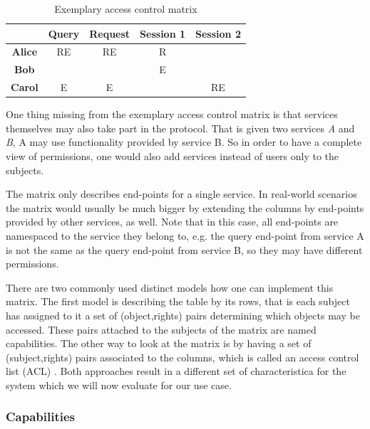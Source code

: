 \begin{table}
    \centering
    \begin{tabular}{|c|c|c|c|c|}
        \hline
              & \bfseries Query & \bfseries Request & \bfseries Session 1 & \bfseries Session 2\\
        \hline
        \bfseries Alice & RE    & RE      & R         &\\
        \hline
        \bfseries Bob   &       &         & E         &\\
        \hline
        \bfseries Carol & E     & E       &           & RE\\
        \hline
    \end{tabular}

    \caption{Exemplary access control matrix}
    \label{tab:access-control-matrix}
\end{table}

One thing missing from the exemplary access control matrix is that services themselves may also take part in the protocol.
That is given two services \emph{A} and \emph{B}, A may use functionality provided by service B.
So in order to have a complete view of permissions, one would also add services instead of users only to the subjects.

The matrix only describes end-points for a single service.
In real-world scenarios the matrix would usually be much bigger by extending the columns by end-points provided by other services, as well.
Note that in this case, all end-points are namespaced to the service they belong to, e.g. the query end-point from service A is not the same as the query end-point from service B, so they may have different permissions.


There are two commonly used distinct models how one can implement this matrix.
The first model is describing the table by its rows, that is each subject has assigned to it a set of (object,rights) pairs determining which objects may be accessed.
These pairs attached to the subjects of the matrix are named capabilities.
The other way to look at the matrix is by having a set of (subject,rights) pairs associated to the columns, which is called an access control list (ACL) \cite{tanenbaum2014modern}.
Both approaches result in a different set of characteristica for the system which we will now evaluate for our use case.

\subsubsection{Capabilities}


